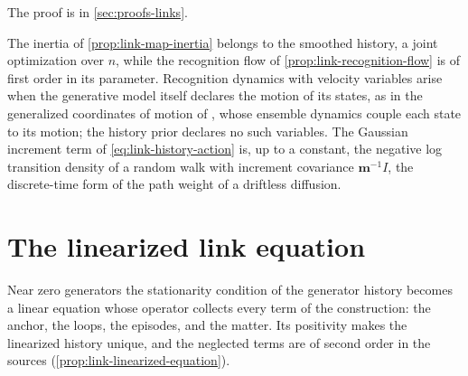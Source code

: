 The proof is in \cref{sec:proofs-links}.

The inertia of \cref{prop:link-map-inertia} belongs to the smoothed history, a joint optimization over
$n$, while the recognition flow of \cref{prop:link-recognition-flow} is of first order in its
parameter. Recognition dynamics with velocity variables arise when the generative model itself
declares the motion of its states, as in the generalized coordinates of motion of
\citet[p.~852, Eq.~(13)]{Friston2008DEM}, whose ensemble dynamics couple each state to its motion;
the history prior declares no such variables. The Gaussian increment term of
\eqref{eq:link-history-action} is, up to a constant, the negative log transition density of a random
walk with increment covariance $\mathbf m^{-1}I$, the discrete-time form of the path weight of a
driftless diffusion.

\section{The linearized link equation}
\label{sec:link-linear}

Near zero generators the stationarity condition of the generator history becomes a linear equation
whose operator collects every term of the construction: the anchor, the loops, the episodes, and the
matter. Its positivity makes the linearized history unique, and the neglected terms are of second
order in the sources (\cref{prop:link-linearized-equation}).


